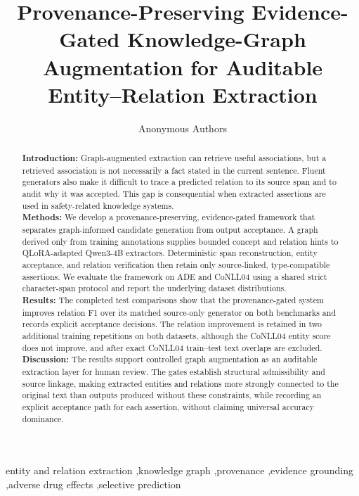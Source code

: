 \documentclass[preprint,12pt]{elsarticle}
\begin{document}
\begin{frontmatter}
\title{Provenance-Preserving Evidence-Gated Knowledge-Graph Augmentation for Auditable Entity--Relation Extraction}
\author{Anonymous Authors}
\begin{abstract}
\textbf{Introduction:} Graph-augmented extraction can retrieve useful
associations, but a retrieved association is not necessarily a fact stated in
the current sentence. Fluent generators also make it difficult to trace a
predicted relation to its source span and to audit why it was accepted. This
gap is consequential when extracted assertions are used in safety-related
knowledge systems.\\
\textbf{Methods:} We develop a provenance-preserving, evidence-gated
framework that separates graph-informed candidate generation from output
acceptance. A graph derived only from training annotations supplies bounded
concept and relation hints to QLoRA-adapted Qwen3-4B extractors. Deterministic
span reconstruction, entity acceptance, and relation verification then retain
only source-linked, type-compatible assertions. We evaluate the framework on
ADE and CoNLL04 using a shared strict character-span protocol and report the
underlying dataset distributions.\\
\textbf{Results:} The completed test comparisons show that the provenance-gated
system improves relation F1 over its matched source-only generator on both
benchmarks and records explicit acceptance decisions. The relation improvement
is retained in two additional training repetitions on both datasets, although the
CoNLL04 entity score does not improve, and after exact CoNLL04 train--test text
overlaps are excluded.\\
\textbf{Discussion:} The results support controlled graph augmentation as an
auditable extraction layer for human review. The gates establish structural
admissibility and source linkage, making extracted entities and relations more
strongly connected to the original text than outputs produced without these
constraints, while recording an explicit acceptance path for each assertion,
without claiming universal accuracy dominance.
\end{abstract}
\begin{keyword}
entity and relation extraction \sep knowledge graph \sep provenance
\sep evidence grounding \sep adverse drug effects \sep selective prediction
\end{keyword}
\end{frontmatter}
\linenumbers
\end{document}

